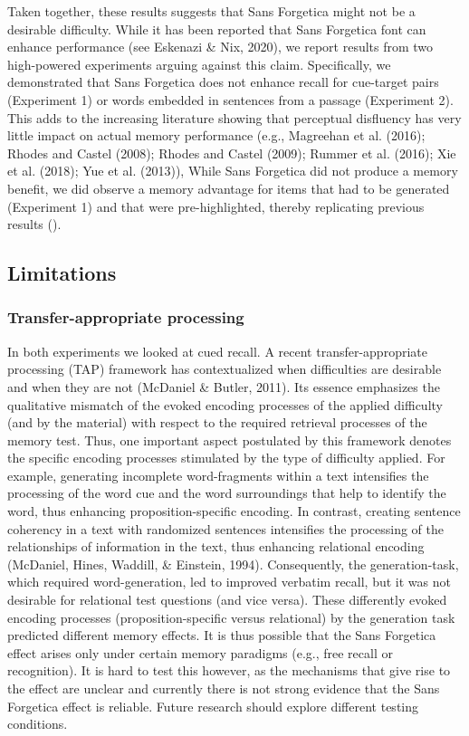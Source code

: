 \documentclass[english,pdf]{apa6}
\begin{document}
Taken together, these results suggests that Sans Forgetica might not be a desirable difficulty. While it has been reported that Sans Forgetica font can enhance performance (see Eskenazi \& Nix, 2020), we report results from two high-powered experiments arguing against this claim. Specifically, we demonstrated that Sans Forgetica does not enhance recall for cue-target pairs (Experiment 1) or words embedded in sentences from a passage (Experiment 2). This adds to the increasing literature showing that perceptual disfluency has very little impact on actual memory performance (e.g., Magreehan et al. (2016); Rhodes and Castel (2008); Rhodes and Castel (2009); Rummer et al. (2016); Xie et al. (2018); Yue et al. (2013)), While Sans Forgetica did not produce a memory benefit, we did observe a memory advantage for items that had to be generated (Experiment 1) and that were pre-highlighted, thereby replicating previous results ().

\hypertarget{limitations}{%
\subsection{Limitations}\label{limitations}}

\hypertarget{transfer-appropriate-processing}{%
\subsubsection{Transfer-appropriate processing}\label{transfer-appropriate-processing}}

In both experiments we looked at cued recall. A recent transfer-appropriate processing (TAP) framework has contextualized when difficulties are desirable and when they are not (McDaniel \& Butler, 2011). Its essence emphasizes the qualitative mismatch of the evoked encoding processes of the applied difficulty (and by the material) with respect to the required retrieval processes of the memory test. Thus, one important aspect postulated by this framework denotes the specific encoding processes stimulated by the type of difficulty applied. For example, generating incomplete word-fragments within a text intensifies the processing of the word cue and the word surroundings that help to identify the word, thus enhancing proposition-specific encoding. In contrast, creating sentence coherency in a text with randomized sentences intensifies the processing of the relationships of information in the text, thus enhancing relational encoding (McDaniel, Hines, Waddill, \& Einstein, 1994). Consequently, the generation-task, which required word-generation, led to improved verbatim recall, but it was not desirable for relational test questions (and vice versa). These differently evoked encoding processes (proposition-specific versus relational) by the generation task predicted different memory effects. It is thus possible that the Sans Forgetica effect arises only under certain memory paradigms (e.g., free recall or recognition). It is hard to test this however, as the mechanisms that give rise to the effect are unclear and currently there is not strong evidence that the Sans Forgetica effect is reliable. Future research should explore different testing conditions.
\end{document}
